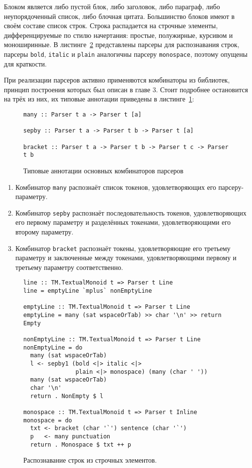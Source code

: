 Блоком является либо пустой блок, либо заголовок, либо параграф, либо
неупорядоченный список, либо блочная цитата. Большинство блоков имеют в своём
составе список строк. Строка распадается на строчные элементы, дифференцируемые
по стилю начертания: простые, полужирные, курсивом и моноширинные.
В листинге~\ref{listing:MarkdownInline} представлены парсеры для распознавания
строк, парсеры \lstinline{bold}, \lstinline{italic} и \lstinline{plain}
аналогичны парсеру \lstinline{monospace}, поэтому опущены для краткости.

При реализации парсеров активно применяются комбинаторы из библиотек, принцип
построения которых был описан в главе 3. Стоит подробнее остановится
на трёх из них, их типовые аннотации приведены в 
листинге~\ref{listing:ParserCombinators}:

\begin{figure}[h]
\begin{lstlisting}
many :: Parser t a -> Parser t [a]

sepby :: Parser t a -> Parser t b -> Parser t [a]

bracket :: Parser t a -> Parser t b -> Parser t c -> Parser t b
\end{lstlisting}
\caption{Типовые аннотации основных комбинаторов парсеров}
\label{listing:ParserCombinators}
\end{figure}

\begin{enumerate}
  \item Комбинатор \lstinline{many} распознаёт список токенов, удовлетворяющих
  его парсеру-параметру.
  \item Комбинатор \lstinline{sepby} распознаёт последовательность токенов,
  удовлетворяющих его первому параметру и разделённых токенами, удовлетворяющими 
  его второму параметру.
  \item Комбинатор \lstinline{bracket} распознаёт токены, удовлетворяющие его
  третьему параметру и заключенные между токенами, удовлетворяющими первому и
  третьему параметру соответственно.
\end{enumerate}

\begin{figure}[t]
\begin{lstlisting}
line :: TM.TextualMonoid t => Parser t Line
line = emptyLine `mplus` nonEmptyLine

emptyLine :: TM.TextualMonoid t => Parser t Line
emptyLine = many (sat wspaceOrTab) >> char '\n' >> return Empty

nonEmptyLine :: TM.TextualMonoid t => Parser t Line
nonEmptyLine = do
  many (sat wspaceOrTab)
  l <- sepby1 (bold <|> italic <|> 
               plain <|> monospace) (many (char ' '))
  many (sat wspaceOrTab)
  char '\n'
  return . NonEmpty $ l

monospace :: TM.TextualMonoid t => Parser t Inline
monospace = do
  txt <- bracket (char '`') sentence (char '`')
  p   <- many punctuation
  return . Monospace $ txt ++ p
\end{lstlisting}
\caption{Распознавание строк из строчных элементов.}
\label{listing:MarkdownInline}
\end{figure}


